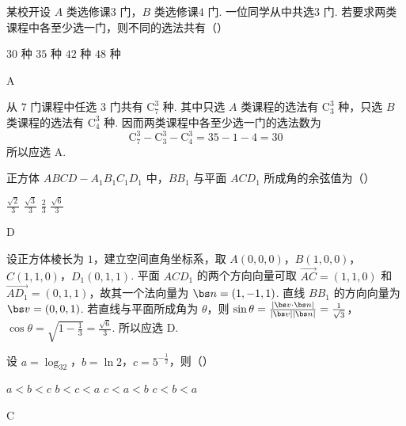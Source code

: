 \begin{problem}
某校开设 \(A\) 类选修课\(3\text{ 门}\)，\(B\) 类选修课\(4\text{ 门}\). 一位同学从中共选\(3\text{ 门}\). 若要求两类课程中各至少选一门，则不同的选法共有（\quad）

\choices
    {\(30\text{ 种}\)}
    {\(35\text{ 种}\)}
    {\(42\text{ 种}\)}
    {\(48\text{ 种}\)}
\end{problem}

\begin{answer}
A
\end{answer}

\begin{solution}
从 \(7\) 门课程中任选 \(3\) 门共有 \(\mathrm C_{7}^{3}\) 种. 其中只选 \(A\) 类课程的选法有
\(\mathrm C_{3}^{3}\) 种，只选 \(B\) 类课程的选法有 \(\mathrm C_{4}^{3}\) 种. 因而两类课程中各至少选一门的选法数为
\[
\mathrm C_{7}^{3}-\mathrm C_{3}^{3}-\mathrm C_{4}^{3}=35-1-4=30
\]
所以应选 A.
\end{solution}

\begin{problem}
正方体 \(ABCD - A_{1}B_{1}C_{1}D_{1}\) 中，\(BB_{1}\) 与平面 \(ACD_{1}\) 所成角的余弦值为（\quad）

\choices
    {\(\frac{\sqrt{2}}{3}\)}
    {\(\frac{\sqrt{3}}{3}\)}
    {\(\frac{2}{3}\)}
    {\(\frac{\sqrt{6}}{3}\)}
\end{problem}

\begin{answer}
D
\end{answer}

\begin{solution}
设正方体棱长为 \(1\)，建立空间直角坐标系，取
\(A(0,0,0)\)，\(B(1,0,0)\)，\(C(1,1,0)\)，\(D_{1}(0,1,1)\). 平面 \(ACD_{1}\) 的两个方向向量可取
\(\overrightarrow{AC}=(1,1,0)\) 和 \(\overrightarrow{AD_{1}}=(0,1,1)\)，故其一个法向量为
\(\bs n=(1,-1,1)\). 直线 \(BB_{1}\) 的方向向量为 \(\bs v=(0,0,1)\). 若直线与平面所成角为 \(\theta\)，则
\(\sin\theta=\frac{|\bs v\cdot\bs n|}{|\bs v||\bs n|}=\frac{1}{\sqrt3}\)，\(\cos\theta=\sqrt{1-\frac13}=\frac{\sqrt6}{3}\).
所以应选 D.
\end{solution}

\begin{problem}
设 \(a = \log_32\)，\(b = \ln 2\)，\(c = 5^{-\frac{1}{2}}\)，则（\quad）

\choices
    {\(a < b < c\)}
    {\(b < c < a\)}
    {\(c < a < b\)}
    {\(c < b < a\)}
\end{problem}

\begin{answer}
C
\end{answer}

